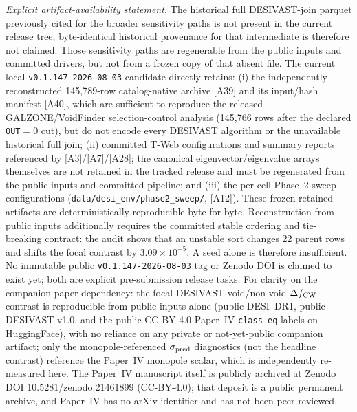 \documentclass[twocolumn,linenumbers]{aastex702}
\newcommand{\paperVersion}{v0.1.147-2026-08-03}
\begin{document}
\emph{Explicit artifact-availability statement.}
The historical full DESIVAST-join parquet previously cited for the broader
sensitivity paths is not present in the current release tree; byte-identical
historical provenance for that intermediate is therefore not claimed. Those
sensitivity paths are regenerable from the public inputs and committed drivers,
but not from a frozen copy of that absent file. The current local
\texttt{\paperVersion} candidate directly retains:
(i) the independently reconstructed 145,789-row catalog-native archive [A39]
and its input/hash manifest [A40], which are sufficient to reproduce the
released-GALZONE/VoidFinder selection-control analysis (145,766 rows after the
declared \texttt{OUT}$=0$ cut), but do not encode every DESIVAST algorithm or
the unavailable historical full join;
(ii) committed T-Web configurations and summary reports referenced by
[A3]/[A7]/[A28]; the canonical eigenvector/eigenvalue arrays themselves
are not retained in the tracked release and must be regenerated from the
public inputs and committed pipeline;
and (iii) the per-cell Phase~2 sweep configurations
(\texttt{data/desi\_env/phase2\_sweep/}, [A12]).
These frozen retained artifacts are deterministically reproducible byte for
byte. Reconstruction from public inputs additionally requires the committed
stable ordering and tie-breaking contract: the audit shows that an unstable
sort changes 22 parent rows and shifts the focal contrast by
$3.09\times10^{-5}$. A seed alone is therefore insufficient.
No immutable public \texttt{\paperVersion} tag or Zenodo DOI is claimed to
exist yet; both are explicit pre-submission release tasks. For clarity on the
companion-paper dependency: the focal DESIVAST void/non-void
$\Delta f_{\rm CW}$ contrast is reproducible from public inputs alone
(public DESI~DR1, public DESIVAST v1.0, and the public CC-BY-4.0 Paper~IV
\texttt{class\_eq} labels on HuggingFace), with no reliance on any private
or not-yet-public companion artifact; only the monopole-referenced
$\sigma_{\rm pred}$ diagnostics (not the headline contrast) reference the
Paper~IV monopole scalar, which is independently re-measured here.
The Paper~IV manuscript itself is publicly archived at Zenodo DOI
10.5281/zenodo.21461899 (CC-BY-4.0); that deposit is a public permanent
archive, and Paper~IV has no arXiv identifier and has not been peer reviewed.
\end{document}
